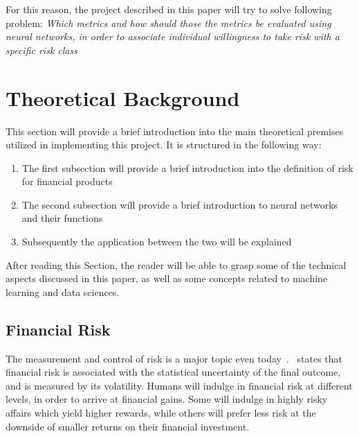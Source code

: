 \documentclass[12pt]{article}
\begin{document}
For this reason, the project described in this paper will try to solve following problem:
\textit{Which metrics and how should those the metrics be evaluated using neural networks, in order to associate individual willingness to take risk with a specific risk class}

\section{Theoretical Background}
\label{sec:theoretical_background}

This section will provide a brief introduction into the main theoretical premises utilized in implementing this project. It is structured in the following way:

\begin{enumerate}
    \item The first subsection will provide a brief introduction into the definition of risk for financial products
    \item The second subsection will provide a brief introduction to neural networks and their functions
    \item Subsequently the application between the two will be explained
\end{enumerate}

After reading this Section, the reader will be able to grasp some of the technical aspects discussed in this paper, as well as some concepts related to machine learning and data sciences.

\subsection{Financial Risk}
\label{sub:financial_risk}

The measurement and control of risk is a major topic even today~\cite{finRisk}.~\cite{finRisk} states that financial risk is associated with the statistical uncertainty of the final outcome, and is measured by its volatility. Humans will indulge in financial risk at different levels, in order to arrive at financial gains. Some will indulge in highly risky affairs which yield higher rewards, while others will prefer less risk at the downside of smaller returns on their financial investment.
\end{document}
